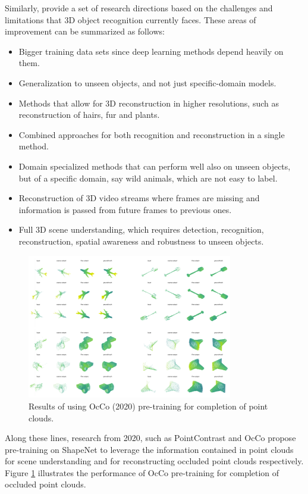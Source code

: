 Similarly, \citeauthor{han2019image} provide a set of research directions based on the challenges and limitations that 3D object recognition currently faces. These areas of improvement can be summarized as follows:
\begin{itemize}
    \item Bigger training data sets since deep learning methods depend heavily on them. 
    \item Generalization to unseen objects, and not just specific-domain models.
    \item Methods that allow for 3D reconstruction in higher resolutions, such as reconstruction of hairs, fur and plants.
    \item Combined approaches for both recognition and reconstruction in a single method.
    \item Domain specialized methods that can perform well also on unseen objects, but of a specific domain, say wild animals, which are not easy to label.
    \item Reconstruction of 3D video streams where frames are missing and information is passed from future frames to previous ones.
    \item Full 3D scene understanding, which requires detection, recognition, reconstruction, spatial awareness and robustness to unseen objects.
\end{itemize}
\begin{figure}[!ht]
        \centering
        \includegraphics[width=0.8\textwidth]{images/occo-results}
        \caption{Results of using OcCo (2020) pre-training for completion of point clouds.}
        \label{fig:occo-results}
    \end{figure}
    
Along these lines, research from 2020, such as PointContrast \cite{xie2020pointcontrast} and OcCo \cite{wang2020pre} propose pre-training on ShapeNet \cite{chang2015shapenet} to leverage the information contained in point clouds for scene understanding and for reconstructing occluded point clouds respectively. Figure \ref{fig:occo-results} illustrates the performance of OcCo pre-training  for completion of occluded point clouds.



